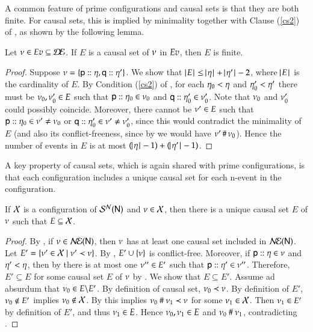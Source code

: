 A common feature of prime configurations and causal sets is that they
are both finite. For causal sets, this is implied by minimality
together with Clause (\ref{cs2}) of , as shown by the
following lemma. 
\\
%

\begin{lemma}
\label{cs-prop}
 Let $\nu\in Ev \subseteq \mathcal{D\!E}$. If $E$ is a causal set of $\nu$ in $Ev$,
  then $E$ is finite. 
\end{lemma} 
\begin{proof}
  Suppose
  $\nu=\{{\sf p}:: \eta,{\sf q}:: \eta'\}$.  We show that
  $\cardin{E} \leq \cardin{\procev} + \cardin{\procev'} - 2$, where
  $\!\!~|~\! E\!~|~\!$ is the cardinality of $E$.  By Condition (\ref{cs2}) of , for
  each $\eta_0 < \eta$ and $\eta'_0 < \eta'$ there must be
  $\nu_0, \nu'_0\in E$ such that ${\sf p}:: \eta_0 \in
  \nu_0$ and ${\sf q}:: \eta'_0 \in \nu'_0$. Note that
  $\nu_0$ and $\nu'_0$ could possibly coincide. Moreover, there
  cannot be $\nu'\in E$ such that ${\sf p}:: \eta_0
  \in \nu' \neq \nu_0$ or ${\sf q}:: \eta'_0 \in \nu'
  \neq \nu'_0$, since this would contradict the
  minimality of
  $E$  (and also its conflict-freeness, since by
   we would have $\nu' \,\#\, \nu_0$). 
Hence the number of events in $E$ is at most $(\cardin{\procev}
  -1) + (\cardin{\procev'} - 1)$.
\end{proof}



 A key property of causal sets, which is again shared with prime
configurations, is that each configuration includes a unique causal
set for each n-event in the configuration.



\begin{lemma}\label{csl}
  If $\mathcal{X}$ is a configuration of $\mathcal{S}^{\mathcal{N}}({\sf N})$ and $\nu\in\mathcal{X}$, then there is a
 unique causal set $E$ of $\nu$ such that $E\subseteq\mathcal{X}$.
\end{lemma}
\begin{proof} 
  By , if $\nu\in \mathcal{N\!E}({\sf N})$, then $\nu$
  has at least one causal set included in $\mathcal{N\!E}({\sf N})$.  Let
  $E'=\{\nu'\in\mathcal{X}\mid \nu'\prec\nu\}$. By
  , $E'\cup \{\nu\}$ is conflict-free.
  Moreover, if ${\sf p}:: \eta\in \nu$ and $\eta' <
  \eta$, then by  there is at most one
 $\nu'' \in E'$ such that ${\sf p}:: \eta'\in \nu''$. 
  Therefore, $E'\subseteq E$ for some causal set $E$ of $\nu$ by
  .  We show that $E\subseteq E'$.  Assume ad absurdum
  that $\nu_0\in E\backslash E'$.  By definition of causal set,
  $\nu_0\prec\nu$. By definition of $E'$, $\nu_0\not\in E'$
  implies $\nu_0\not\in \mathcal{X}$.  By  this implies
  $\nu_0~\#~\nu_1\prec\nu$ for some $\nu_1\in\mathcal{X}$. Then
  $\nu_1\in E'$ by definition of $E'$, and thus $\nu_1\in E$.
  Hence $\nu_0,\nu_1\in E$ and $\nu_0~\#~\nu_1$,
  contradicting .
\end{proof}



